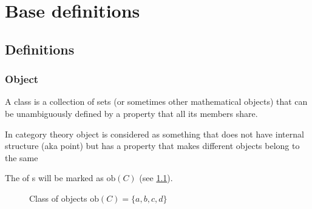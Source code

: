 \chapter{Base definitions}

\section{Definitions}

\subsection{Object}

\begin{definition}[Class]
  A class is a collection of sets (or sometimes other mathematical
  objects) that can be unambiguously defined by a property that all
  its members share. 
  \label{def:class}
\end{definition}

\begin{definition}[Object]
  \label{def:object}
  In category theory object is considered as something that does not
  have internal structure (aka point) but has a property that makes
  different objects belong to the same 
\end{definition}

\begin{remark}
  \label{rem:objclass}
  The  of s will be marked as 
  $\mathrm{ob}(C)$ (see \cref{fig:class_of_objects}).
\end{remark}

\begin{figure}
  \centering
  \caption{Class of objects $\mathrm{ob}(C)=\{a,b,c,d\}$}
  \label{fig:class_of_objects}
\end{figure}



